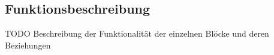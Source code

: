 \subsection{Funktionsbeschreibung}
TODO Beschreibung der Funktionalität der einzelnen Blöcke und deren Beziehungen 